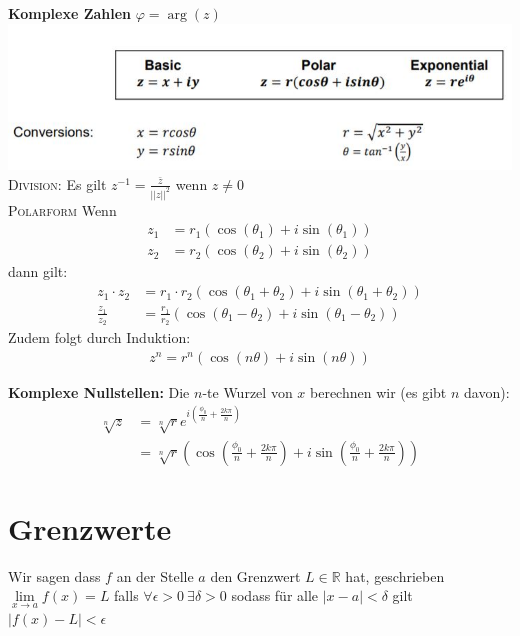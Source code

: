 \documentclass[25pt]{sciposter}
\newcommand{\R}{\mathbb{R}}
\newenvironment{method}[1]{\begin{mdframed}[backgroundcolor=blue!10,innertopmargin=15pt, innerbottommargin=15pt, nobreak=true]
		\textbf{#1 }
	}
	{ 
	\end{mdframed}
}
\begin{document}
\begin{multicols}{3}
\begin{method}{Komplexe Zahlen} ${\displaystyle \varphi =\arg(z)}$\\
\includegraphics[scale=1.4]{complex.jpg}\\
\textsc{Division:} Es gilt $z^{-1} = \frac{\bar{z}}{||z||^2}$ wenn $z \not = 0$\\
\textsc{Polarform} Wenn \begin{align*}
z_1 &= r_1(\cos(\theta_1) + i\sin(\theta_1))\\
z_2 &= r_2(\cos(\theta_2) + i\sin(\theta_2))
\end{align*}
dann gilt: 
\begin{align*}
z_1 \cdot z_2 &= r_1 \cdot r_2 \left(\cos(\theta_1 + \theta_2) + i\sin(\theta_1 + \theta_2)\right)\\
\frac{z_1}{z_2} &= \frac{r_1}{r_2}\left(\cos(\theta_1 - \theta_2) + i\sin(\theta_1 - \theta_2)\right)
\end{align*}
Zudem folgt durch Induktion:
\begin{align*}
	z^n = r^n (\cos(n\theta) + i \sin(n \theta))
\end{align*}

\textbf{Komplexe Nullstellen:} Die $n$-te Wurzel von $x$ berechnen wir (es gibt $n$ davon):
\begin{align*}
	\sqrt[n]{z} &= \sqrt[n]{r} e^{i \left( \frac{\phi_0}{n} + \frac{2k\pi}{n}\right)}\\
	&= \sqrt[n]{r} \left(\cos\left( \frac{\phi_0}{n} + \frac{2k\pi}{n}\right) + i \sin\left( \frac{\phi_0}{n} + \frac{2k\pi}{n}\right)\right)
\end{align*}

\end{method}





\section*{Grenzwerte}
Wir sagen dass $f$ an der Stelle $a$ den Grenzwert $L\in \R$ hat, geschrieben $\lim\limits_{x \to a} f(x) = L$ falls $\forall \epsilon > 0 \ \exists \delta > 0 $ sodass für alle $|x-a|<\delta$ gilt $|f(x)-L|< \epsilon$


\end{multicols}
\end{document}
